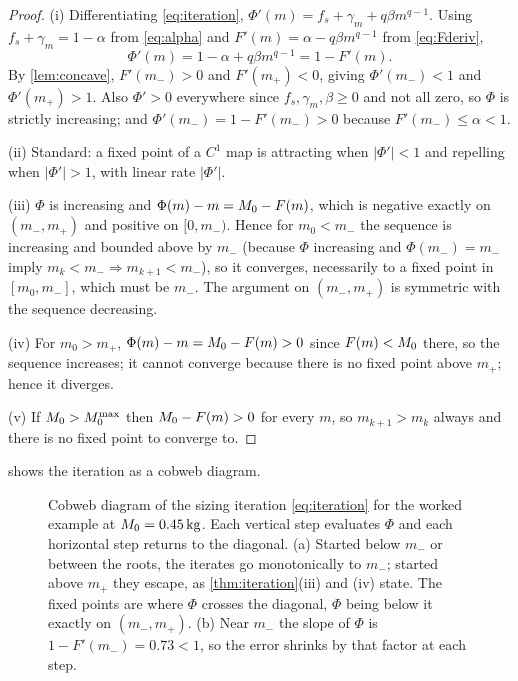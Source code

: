 \begin{proof}
(i) Differentiating \cref{eq:iteration},
$\Phi'(m) = f_s+\gamma_m + q\beta m^{q-1}$. Using
$f_s+\gamma_m = 1-\alpha$ from \cref{eq:alpha} and
$F'(m)=\alpha - q\beta m^{q-1}$ from \cref{eq:Fderiv},
\[
  \Phi'(m) = 1-\alpha + q\beta m^{q-1} = 1 - F'(m).
\]
By \cref{lem:concave}, $F'(m_-)>0$ and $F'(m_+)<0$, giving $\Phi'(m_-)<1$ and
$\Phi'(m_+)>1$. Also $\Phi'>0$ everywhere since $f_s,\gamma_m,\beta\ge0$ and not
all zero, so $\Phi$ is strictly increasing; and $\Phi'(m_-) = 1-F'(m_-) > 0$
because $F'(m_-) \le \alpha < 1$.

(ii) Standard: a fixed point of a $C^1$ map is attracting when
$|\Phi'|<1$ and repelling when $|\Phi'|>1$, with linear rate $|\Phi'|$.

(iii) $\Phi$ is increasing and $\Phi(m)-m = M_0-F(m)$, which is negative
exactly on $(m_-,m_+)$ and positive on $[0,m_-)$. Hence for $m_0<m_-$ the
sequence is increasing and bounded above by $m_-$ (because $\Phi$ increasing
and $\Phi(m_-)=m_-$ imply $m_k<m_-\Rightarrow m_{k+1}<m_-$), so it converges,
necessarily to a fixed point in $[m_0,m_-]$, which must be $m_-$. The argument
on $(m_-,m_+)$ is symmetric with the sequence decreasing.

(iv) For $m_0>m_+$, $\Phi(m)-m = M_0 - F(m) > 0$ since $F(m)<M_0$ there,
so the sequence increases; it cannot converge because there is no fixed point
above $m_+$; hence it diverges.

(v) If $M_0>M_0^{\max}$ then $M_0-F(m)>0$ for every $m$, so
$m_{k+1}>m_k$ always and there is no fixed point to converge to.
\end{proof}

 shows the iteration as a cobweb diagram.

\begin{figure}[tbp]
\centering

\caption{Cobweb diagram of the sizing iteration \cref{eq:iteration} for the
worked example at $M_0=\SI{0.45}{\kilo\gram}$. Each vertical step evaluates
$\Phi$ and each horizontal step returns to the diagonal. (a) Started below
$m_-$ or between the roots, the iterates go monotonically to $m_-$; started
above $m_+$ they escape, as \cref{thm:iteration}(iii) and (iv) state. The
fixed points are where $\Phi$ crosses the diagonal, $\Phi$ being below it
exactly on $(m_-,m_+)$. (b) Near $m_-$ the slope of $\Phi$ is
$1-F'(m_-)=0.73<1$, so the error shrinks by that factor at each step.}
\label{fig:cobweb}
\end{figure}


